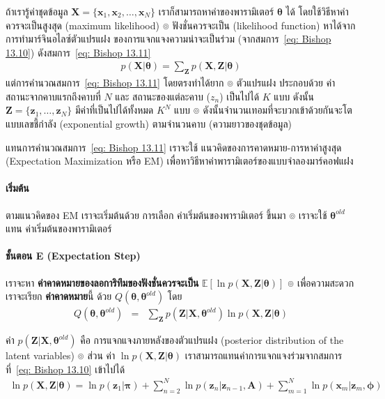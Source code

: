 ถ้าเรารู้ค่าชุดข้อมูล $\textbf{X} = \{ \textbf{x}_1, \textbf{x}_2, \ldots, \textbf{x}_N\}$ เราก็สามารถหาค่าของพารามิเตอร์ $\bm{\theta}$ ได้ โดยใช้วิธีหาค่าควรจะเป็นสูงสุด (maximum likelihood) ๏
ฟังชั่นควรจะเป็น (likelihood function) หาได้จาก การทำมาร์จินอไลซ์ตัวแปรแฝง ของการแจกแจงความน่าจะเป็นร่วม (จากสมการ~\ref{eq: Bishop 13.10}) ดังสมการ~\ref{eq: Bishop 13.11}
\begin{eqnarray}
p(\textbf{X}|\bm{\theta}) = \sum_{\textbf{Z}} p (\textbf{X}, \textbf{Z}|\bm{\theta})
\label{eq: Bishop 13.11}
\end{eqnarray}
แต่การคำนวณสมการ~\ref{eq: Bishop 13.11} โดยตรงทำได้ยาก
๏ ตัวแปรแฝง ประกอบด้วย ค่าสถานะจากคาบแรกถึงคาบที่ $N$ และ สถานะของแต่ละคาบ ($z_n$)  เป็นไปได้ $K$ แบบ ดังนั้น $\textbf{Z} = \{\textbf{z}_1, \ldots, \textbf{z}_N\}$ มีค่าที่เป็นไปได้ทั้งหมด $K^N$ แบบ 
๏ ดังนั้นจำนวนเทอมที่จะบวกเข้าด้วยกันจะโตแบบเลขชี้กำลัง (exponential growth) ตามจำนวนคาบ (ความยาวของชุดข้อมูล)

แทนการคำนวณสมการ~\ref{eq: Bishop 13.11} เราจะใช้ แนวคิดของการคาดหมาย-การหาค่าสูงสุด (Expectation Maximization หรือ EM) เพื่อหาวิธีหาค่าพารามิเตอร์ของแบบจำลองมาร์คอฟแฝง

\paragraph{เริ่มต้น} ตามแนวคิดของ EM เราจะเริ่มต้นด้วย การเลือก ค่าเริ่มต้นของพารามิเตอร์ ขึ้นมา ๏ เราจะใช้ $\bm{\theta}^{old}$ แทน ค่าเริ่มต้นของพารามิเตอร์

\paragraph{ชั้นตอน E (Expectation Step)} เราจะหา \textbf{ค่าคาดหมายของลอการิทึมของฟังชั่นควรจะเป็น} $\mathbb{E}
[\ln p(\textbf{X}, \textbf{Z}|\bm{\theta})]$ 
๏ เพื่อความสะดวก เราจะเรียก \textbf{ค่าคาดหมาย}นี้ ด้วย  $Q(\bm{\theta}, \bm{\theta}^{old})$
โดย
\begin{eqnarray}
Q(\bm{\theta}, \bm{\theta}^{old})
&=& \sum_{\textbf{Z}} p(\textbf{Z}|\textbf{X}, \bm{\theta}^{old}) \ln p(\textbf{X}, \textbf{Z}|\bm{\theta})
\label{eq: Bishop 13.12}
\end{eqnarray}

ค่า $p(\textbf{Z}|\textbf{X}, \bm{\theta}^{old})$ คือ การแจกแจงภายหลังของตัวแปรแฝง (posterior distribution of the latent variables) 
๏ ส่วน ค่า $\ln p(\textbf{X}, \textbf{Z}|\bm{\theta})$ เราสามารถแทนค่าการแจกแจงร่วมจากสมการที่~\ref{eq: Bishop 13.10} เข้าไปได้
\begin{eqnarray}
\ln p(\textbf{X}, \textbf{Z}|\bm{\theta})
=
\ln p(\textbf{z}_1|\bm{\pi}) + \sum_{n=2}^N \ln p(\textbf{z}_n|\textbf{z}_{n-1}, \textbf{A}) + \sum_{m=1}^{N} \ln p(\textbf{x}_m|\textbf{z}_m, \bm{\phi})
\label{eq: HMM log joint distribution 1}
\end{eqnarray}


